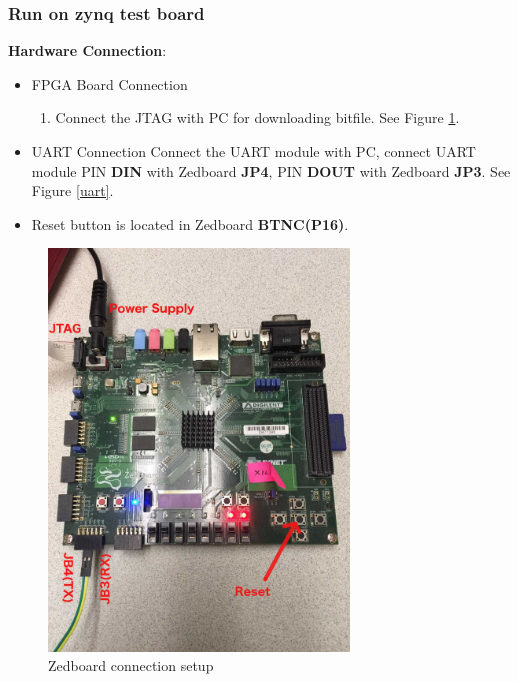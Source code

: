 \subsubsection{Run on zynq test board}
\textbf{Hardware Connection}:
\begin{itemize}
	\item FPGA Board Connection
	\begin{enumerate}
		\item Connect the JTAG with PC for downloading bitfile. See Figure \ref{FPGA}.
	\end{enumerate}
	\item UART Connection
		Connect the UART module with PC, connect UART module PIN \textbf{DIN} with Zedboard \textbf{JP4}, PIN \textbf{DOUT} with Zedboard \textbf{JP3}. See Figure \ref{uart}.
	\item Reset button is located in Zedboard  \textbf{BTNC(P16)}.
\end{itemize}


\begin{figure}[h]
\caption{Zedboard connection setup}
\label{FPGA}
\includegraphics[width=8cm]{./fig/FPGA.jpg}
\centering
\end{figure}

